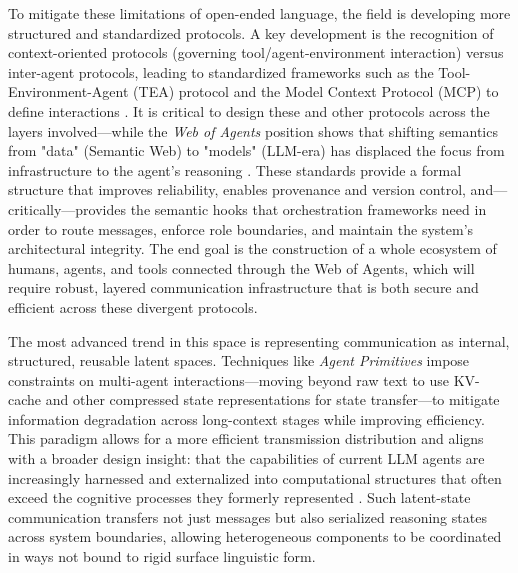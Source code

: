 \documentclass[11pt,a4paper]{article}
\begin{document}
To mitigate these limitations of open-ended language, the field is developing more structured and standardized protocols. A key development is the recognition of context-oriented protocols (governing tool/agent-environment interaction) versus inter-agent protocols, leading to standardized frameworks such as the Tool-Environment-Agent (TEA) protocol and the Model Context Protocol (MCP) to define interactions \cite{arxiv:2506.12508v6,arxiv:2506.05364v2}. It is critical to design these and other protocols across the layers involved---while the \emph{Web of Agents} position shows that shifting semantics from "data" (Semantic Web) to "models" (LLM-era) has displaced the focus from infrastructure to the agent's reasoning \cite{arxiv:2507.10644v4}. These standards provide a formal structure that improves reliability, enables provenance and version control, and---critically---provides the semantic hooks that orchestration frameworks need in order to route messages, enforce role boundaries, and maintain the system's architectural integrity. The end goal is the construction of a whole ecosystem of humans, agents, and tools connected through the Web of Agents, which will require robust, layered communication infrastructure that is both secure and efficient across these divergent protocols.

The most advanced trend in this space is representing communication as internal, structured, reusable latent spaces. Techniques like \emph{Agent Primitives} \cite{arxiv:2602.03695v2} impose constraints on multi-agent interactions---moving beyond raw text to use KV-cache and other compressed state representations for state transfer---to mitigate information degradation across long-context stages while improving efficiency. This paradigm allows for a more efficient transmission distribution and aligns with a broader design insight: that the capabilities of current LLM agents are increasingly harnessed and externalized into computational structures that often exceed the cognitive processes they formerly represented \cite{arxiv:2604.08224v1}. Such latent-state communication transfers not just messages but also serialized reasoning states across system boundaries, allowing heterogeneous components to be coordinated in ways not bound to rigid surface linguistic form.
\end{document}
